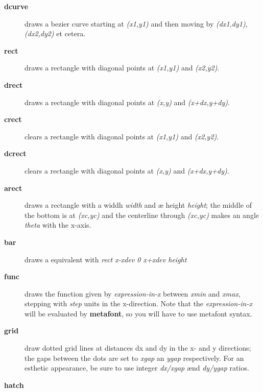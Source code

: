 \documentclass[a4paper,twocolumn]{article}
\begin{document}
\begin{description}
\item[{\textbf{dcurve}}] 

draws a bezier curve starting at \textit{(x1,y1)} and then moving by 
\textit{(dx1,dy1)}, \textit{(dx2,dy2)} et cetera.

\item[{\textbf{rect}}] 

draws a rectangle with diagonal points at \textit{(x1,y1)} and \textit{(x2,y2)}.

\item[{\textbf{drect}}] 

draws a rectangle with diagonal points at \textit{(x,y)} and \textit{(x+dx,y+dy)}.

\item[{\textbf{crect}}] 

clears a rectangle with diagonal points at \textit{(x1,y1)} and \textit{(x2,y2)}.

\item[{\textbf{dcrect}}] 

clears a rectangle with diagonal points at \textit{(x,y)} and \textit{(x+dx,y+dy)}.

\item[{\textbf{arect}}] 

draws a rectangle with a widdh \textit{width} and æ height \textit{height};
the middle of the bottom is at \textit{(xc,yc)} and the centerline through 
\textit{(xc,yc)} makes an angle \textit{theta} with the x-axis.

\item[{\textbf{bar}}] 

draws a equivalent with \textit{rect x-xdev 0 x+xdev height}

\item[{\textbf{func}}] 

draws the function given by \textit{expression-in-x} between \textit{xmin} and
\textit{xmax}, stepping with \textit{step} units in the x-direction.
Note that the \textit{expression-in-x} will be evaluated by \textbf{metafont}, so 
you will have to use metafont syntax.

\item[{\textbf{grid}}] 

draw dotted grid lines at distances dx and dy in the x- and y
directions; the gaps between the dots are set to \textit{xgap} an \textit{ygap}
respectively. For an esthetic appearance, be sure to use integer
\textit{dx/xgap} ænd \textit{dy/ygap} ratios.

\item[{\textbf{hatch}}] 


\end{description}
\end{document}
